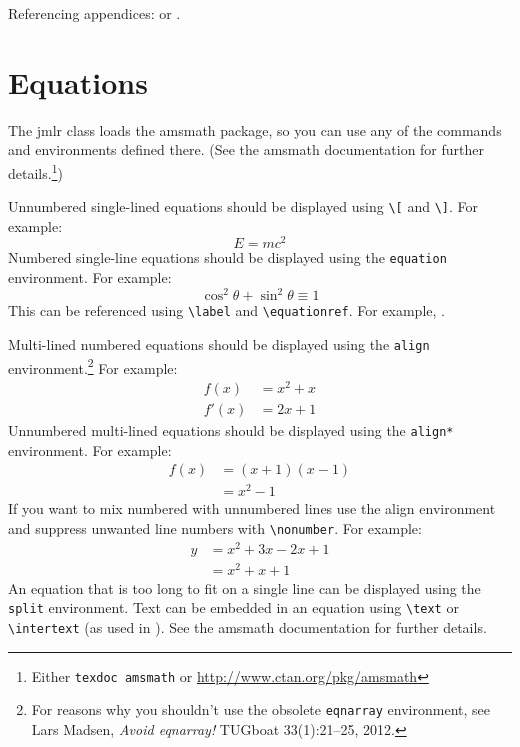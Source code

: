 \documentclass[pmlr]{jmlr}%
\begin{document}
Referencing appendices:  or
.

\section{Equations}
\label{sec:math}

The \textsf{jmlr} class loads the \textsf{amsmath} package, so
you can use any of the commands and environments defined there.
(See the \textsf{amsmath} documentation for further
details.\footnote{Either \texttt{texdoc amsmath} or
\url{http://www.ctan.org/pkg/amsmath}})

Unnumbered single-lined equations should be displayed using
\verb|\[| and \verb|\]|. For example:
\[E = m c^2\]
Numbered single-line equations should be displayed using the
\texttt{equation} environment. For example:
\begin{equation}\label{eq:trigrule}
\cos^2\theta + \sin^2\theta \equiv 1
\end{equation}
This can be referenced using \verb|\label| and \verb|\equationref|.
For example, .

Multi-lined numbered equations should be displayed using the
\texttt{align} environment.\footnote{For reasons why you 
shouldn't use the obsolete \texttt{eqnarray} environment, see
Lars Madsen, \emph{Avoid eqnarray!} TUGboat 33(1):21--25, 2012.} For example:
\begin{align}
f(x) &= x^2 + x\label{eq:f}\\
f'(x) &= 2x + 1\label{eq:df}
\end{align}
Unnumbered multi-lined equations should be displayed using the
\texttt{align*} environment. For example:
\begin{align*}
f(x) &= (x+1)(x-1)\\
&= x^2 - 1
\end{align*}
If you want to mix numbered with unnumbered lines use the
align environment and suppress unwanted line numbers with
\verb|\nonumber|. For example:
\begin{align}
y &= x^2 + 3x - 2x + 1\nonumber\\
&= x^2 + x + 1\label{eq:y}
\end{align}
An equation that is too long to fit on a single line can be
displayed using the \texttt{split} environment. 
Text can be embedded in an equation using \verb|\text| or
\verb|\intertext| (as used in ).
See the \textsf{amsmath} documentation for further details.
\end{document}

